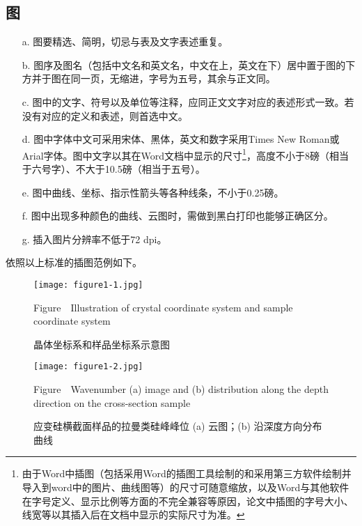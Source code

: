 \subsection{图}
\begin{enumerate}
    \item[a.] 图要精选、简明，切忌与表及文字表述重复。
    \item[b.] 图序及图名（包括中文名和英文名，中文在上，英文在下）居中置于图的下方并于图在同一页，无缩进，字号为五号，其余与正文同。
    \item[c.] 图中的文字、符号以及单位等注释，应同正文文字对应的表述形式一致。若没有对应的定义和表述，则首选中文。
    \item[d.] 图中字体中文可采用宋体、黑体，英文和数字采用Times New Roman或Arial字体。图中文字以其在Word文档中显示的尺寸\footnote{由于Word中插图（包括采用Word的插图工具绘制的和采用第三方软件绘制并导入到word中的图片、曲线图等）的尺寸可随意缩放，以及Word与其他软件在字号定义、显示比例等方面的不完全兼容等原因，论文中插图的字号大小、线宽等以其插入后在文档中显示的实际尺寸为准。}，高度不小于8磅（相当于六号字）、不大于10.5磅（相当于五号）。
    \item[e.] 图中曲线、坐标、指示性箭头等各种线条，不小于0.25磅。
    \item[f.] 图中出现多种颜色的曲线、云图时，需做到黑白打印也能够正确区分。
    \item[g.] 插入图片分辨率不低于72 dpi。
\end{enumerate}

依照以上标准的插图范例如下。
\begin{figure}[H]
    \centering
    \setlength{\abovecaptionskip}{5pt}
    \setlength{\belowcaptionskip}{2pt}
    \texttt{[image: figure1-1.jpg]}
    \caption{晶体坐标系和样品坐标系示意图}
    \label{fig:figure1-1}
    Figure\ \thefigure \ Illustration of crystal coordinate system and sample coordinate system
\end{figure}

\begin{figure}[H]
    \centering
    \setlength{\abovecaptionskip}{5pt}
    \setlength{\belowcaptionskip}{2pt}
    \texttt{[image: figure1-2.jpg]}
    \caption{应变硅横截面样品的拉曼类硅峰峰位 (a) 云图；(b) 沿深度方向分布曲线
    }
    \label{fig:figure1-2}
    Figure\ \thefigure \ Wavenumber (a) image and (b) distribution along the depth direction on the cross-section sample
\end{figure}

